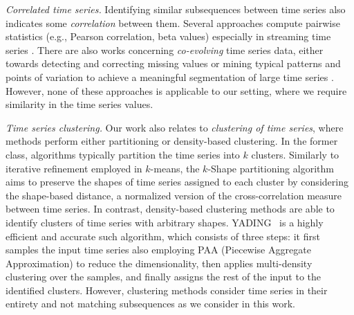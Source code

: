 {{\noindent \emph{Correlated time series.} Identifying similar subsequences between time series also indicates some {\em correlation} between them. Several approaches compute pairwise statistics (e.g., Pearson correlation, beta values) especially in streaming time series \cite{zhu2002statstream,cole2005fast,papadimitriou2006local}. There are also works concerning {\em co-evolving} time series data, either towards detecting and correcting missing values \cite{yongjie2015fast} or mining typical patterns and points of variation to achieve a meaningful segmentation of large time series \cite{matsubara2014autoplait}. However, none of these approaches is applicable to our setting, where we require similarity in the time series values. 

\noindent \emph{Time series clustering.} Our work also relates to {\em clustering of time series}, where methods perform either partitioning or density-based clustering. In the former class, algorithms typically partition the time series into $k$ clusters. Similarly to iterative refinement employed in $k$-means, the $k$-Shape partitioning algorithm~\cite{Paparrizos:2015:KEA:2723372.2737793,Paparrizos:2017:FAT:3086510.3044711} aims to preserve the shapes of time series assigned to each cluster by considering the shape-based distance, a normalized version of the cross-correlation measure between time series. In contrast, density-based clustering methods are able to identify clusters of time series with arbitrary shapes. YADING~\cite{Ding:2015:YFC:2735479.2735481} is a highly efficient and accurate such algorithm, which consists of three steps: it first samples the input time series also employing PAA (Piecewise Aggregate Approximation) to reduce the dimensionality, then applies multi-density clustering over the samples, and finally assigns the rest of the input to the identified clusters. However, clustering methods consider time series in their entirety and not matching subsequences as we consider in this work.

}}
